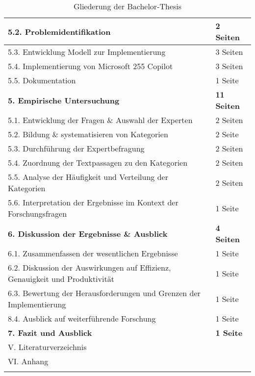 \begin{longtable}{|p{9cm}|p{2.5cm}|}
        \hline
        5.2. Problemidentifikation & 2 Seiten \\
        \hline
        5.3. Entwicklung Modell zur Implementierung & 3 Seiten \\
        \hline
        5.4. Implementierung von Microsoft 255 Copilot & 3 Seiten \\
        \hline
        5.5. Dokumentation & 1 Seite \\
    \hline
    \textbf{5. Empirische Untersuchung} & \textbf{11 Seiten} \\
    \hline
        5.1. Entwicklung der Fragen \& Auswahl der Experten & 2 Seiten \\
        \hline
        5.2. Bildung \& systematisieren von Kategorien & 2 Seite \\
        \hline
        5.3. Durchführung der Expertbefragung & 2 Seiten \\
        \hline
        5.4. Zuordnung der Textpassagen zu den Kategorien & 2 Seiten \\
        \hline
        5.5. Analyse der Häufigkeit und Verteilung der Kategorien & 2 Seiten \\
        \hline
        5.6. Interpretation der Ergebnisse im Kontext der Forschungsfragen & 1 Seite \\
    \hline
    \textbf{6. Diskussion der Ergebnisse \& Ausblick} & \textbf{4 Seiten} \\
    \hline
        6.1. Zusammenfassen der wesentlichen Ergebnisse & 1 Seite \\
        \hline
        6.2. Diskussion der Auswirkungen auf Effizienz, Genauigkeit und Produktivität & 1 Seite \\
        \hline
        6.3. Bewertung der Herausforderungen und Grenzen der Implementierung & 1 Seite \\
        \hline
        8.4. Ausblick auf weiterführende Forschung & 1 Seite \\
    \hline
    \textbf{7. Fazit und Ausblick} & \textbf{1 Seite} \\
    \hline
    V. Literaturverzeichnis & \\
    \hline
    VI. Anhang & \\
    \hline
    \caption{Gliederung der Bachelor-Thesis} \label{tab:gliederung} \\
\end{longtable}



\clearpage
